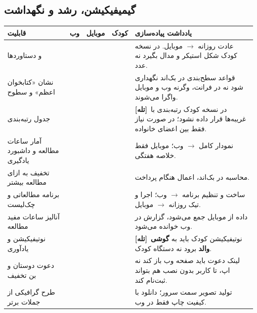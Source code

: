 \documentclass[11pt,a4paper]{article}
\newcommand{\lt}[1]{{\latinfont\LRE{#1}}}
\newcommand{\full}{\textcolor{sys}{\CIRCLE}}
\newcommand{\half}{\textcolor{soft}{\LEFTcircle}}
\newcommand{\none}{\textcolor{rule}{\Circle}}
\newcommand{\tagbox}[2]{{\small\textcolor{#1}{\textbf{#2}}}}
\newcommand{\ttrap}{\tagbox{warn}{[تله]}}
\newcommand{\feathead}{%
\toprule
\textbf{قابلیت} & \textcolor{web}{\textbf{وب}} & \textcolor{mob}{\textbf{موبایل}} & \textcolor{kid}{\textbf{کودک}} & \textbf{یادداشت پیاده‌سازی} \\
\midrule
}
\begin{document}
\subsection{گیمیفیکیشن، رشد و نگهداشت}
\begin{longtable}{@{}F{3.9cm} c c c N{7.2cm}@{}}
\feathead
\endhead
\lt{Streak} و دستاوردها & \half & \full & \full & عادت روزانه $\rightarrow$ موبایل. در نسخه کودک شکل استیکر و مدال بگیرد نه عدد. \\
نشان «کتابخوان اعظم» و سطوح & \full & \full & \half & قواعد سطح‌بندی در بک‌اند نگهداری شود نه در فرانت، وگرنه وب و موبایل واگرا می‌شوند. \\
جدول رتبه‌بندی & \full & \full & \none & \ttrap\ در نسخه کودک رتبه‌بندی با غریبه‌ها قرار داده نشود؛ در صورت نیاز فقط بین اعضای خانواده. \\
آمار ساعات مطالعه و داشبورد یادگیری & \full & \half & \none & نمودار کامل $\rightarrow$ وب؛ موبایل فقط خلاصه هفتگی. \\
تخفیف به ازای مطالعه بیشتر & \full & \full & \none & محاسبه در بک‌اند، اعمال هنگام پرداخت. \\
برنامه مطالعاتی و چک‌لیست & \full & \full & \half & ساخت و تنظیم برنامه $\rightarrow$ وب؛ اجرا و تیک روزانه $\rightarrow$ موبایل. \\
آنالیز ساعات مفید مطالعه & \full & \half & \none & داده از موبایل جمع می‌شود، گزارش در وب خوانده می‌شود. \\
نوتیفیکیشن و یادآوری & \half & \full & \full & \ttrap\ نوتیفیکیشن کودک باید به \textbf{گوشی والد} برود نه دستگاه کودک. \\
دعوت دوستان و بن تخفیف & \full & \full & \none & لینک دعوت باید صفحه وب باز کند نه اپ، تا کاربر بدون نصب هم بتواند ثبت‌نام کند. \\
طرح گرافیکی از جملات برتر & \full & \full & \none & تولید تصویر سمت سرور؛ دانلود با کیفیت چاپ فقط در وب. \\
\bottomrule
\end{longtable}
\end{document}
